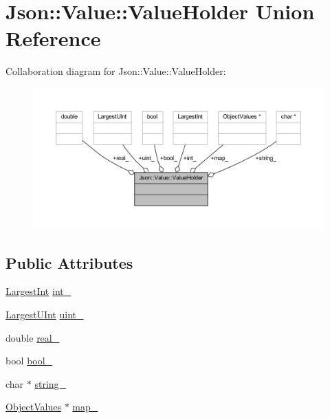 \hypertarget{union_json_1_1_value_1_1_value_holder}{}\section{Json\+:\+:Value\+:\+:Value\+Holder Union Reference}
\label{union_json_1_1_value_1_1_value_holder}


Collaboration diagram for Json\+:\+:Value\+:\+:Value\+Holder\+:\nopagebreak
\begin{figure}[H]
\begin{center}
\leavevmode
\includegraphics[width=350pt]{union_json_1_1_value_1_1_value_holder__coll__graph}
\end{center}
\end{figure}
\subsection*{Public Attributes}
\begin{DoxyCompactItemize}
\item 
\hyperlink{class_json_1_1_value_a1cbb82642ed05109b9833e49f042ece7}{Largest\+Int} \hyperlink{union_json_1_1_value_1_1_value_holder_adbfb384301298844ed955ba5cf6015a0}{int\+\_\+}
\item 
\hyperlink{class_json_1_1_value_a6682a3684d635e03fc06ba229fa24eec}{Largest\+U\+Int} \hyperlink{union_json_1_1_value_1_1_value_holder_aab65665dc15a24a29a8e93cdeeaa7e50}{uint\+\_\+}
\item 
double \hyperlink{union_json_1_1_value_1_1_value_holder_af0c5ca724e5fe3a15db773d750e2351e}{real\+\_\+}
\item 
bool \hyperlink{union_json_1_1_value_1_1_value_holder_a92edab1861dadbfefd8be5fd4285eefe}{bool\+\_\+}
\item 
char $\ast$ \hyperlink{union_json_1_1_value_1_1_value_holder_a70ac2b153bc405527baa3850d2ddc3cb}{string\+\_\+}
\item 
\hyperlink{class_json_1_1_value_a08b6c80c3af7071d908dabf044de5388}{Object\+Values} $\ast$ \hyperlink{union_json_1_1_value_1_1_value_holder_a1e7a5b86d4f52234f55c847ad1ce389a}{map\+\_\+}
\end{DoxyCompactItemize}


